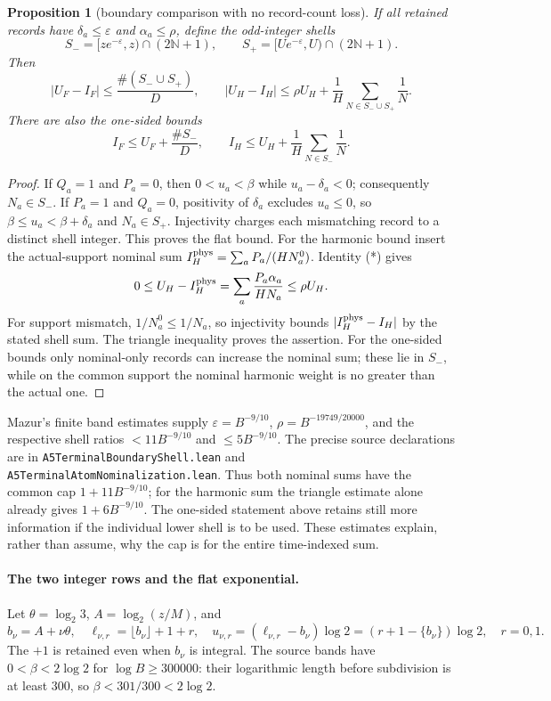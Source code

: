 \documentclass[11pt]{article}
\newtheorem{proposition}{Proposition}
\theoremstyle{remark}\newtheorem{remark}[proposition]{Remark}
\begin{document}
\begin{proposition}[boundary comparison with no record-count loss]
\label{prop:mazur-boundaries}
If all retained records have $\delta_a\le\varepsilon$ and
$\alpha_a\le\rho$, define the odd-integer shells
\[
 S_-=[ze^{-\varepsilon},z)\cap(2\mathbb N+1),\qquad
 S_+=[Ue^{-\varepsilon},U)\cap(2\mathbb N+1).
\]
Then
\[
 |U_F-I_F|\le\frac{\#(S_-\cup S_+)}D,\qquad
 |U_H-I_H|\le\rho U_H+
       \frac1H\sum_{N\in S_-\cup S_+}\frac1N.
 \label{eq:mazur-shell-bounds}
\]
There are also the one-sided bounds
\[
 I_F\le U_F+\frac{\#S_-}{D},\qquad
 I_H\le U_H+\frac1H\sum_{N\in S_-}\frac1N.
\]
\end{proposition}
\begin{proof}
If $Q_a=1$ and $P_a=0$, then $0<u_a<\beta$ while
$u_a-\delta_a<0$; consequently $N_a\in S_-$.
If $P_a=1$ and $Q_a=0$, positivity of $\delta_a$ excludes
$u_a\le0$, so $\beta\le u_a<\beta+\delta_a$ and
$N_a\in S_+$. Injectivity charges each mismatching record to
a distinct shell integer. This proves the flat bound.
For the harmonic bound insert the actual-support nominal sum
$I_H^{\rm phys}=\sum_a P_a/(HN_a^0)$. Identity (*) gives
\[
 0\le U_H-I_H^{\rm phys}
       =\sum_a\frac{P_a\alpha_a}{HN_a}\le\rho U_H.
\]
For support mismatch, $1/N_a^0\le1/N_a$, so injectivity
bounds $|I_H^{\rm phys}-I_H|$ by the stated shell sum.
The triangle inequality proves the assertion.
For the one-sided bounds only nominal-only records can increase
the nominal sum; these lie in $S_-$, while on the common support
the nominal harmonic weight is no greater than the actual one.
\end{proof}

Mazur's finite band estimates supply
$\varepsilon=B^{-9/10}$, $\rho=B^{-19749/20000}$, and the
respective shell ratios $<11B^{-9/10}$ and $\le5B^{-9/10}$.
The precise source declarations are in
\texttt{A5TerminalBoundaryShell.lean} and
\texttt{A5TerminalAtomNominalization.lean}.
Thus both nominal sums have the common cap $1+11B^{-9/10}$;
for the harmonic sum the triangle estimate alone already gives
$1+6B^{-9/10}$. The one-sided statement above retains still more
information if the individual lower shell is to be used.
These estimates explain, rather than assume, why the cap is for
the entire time-indexed sum.

\paragraph{The two integer rows and the flat exponential.}
Let $\theta=\log_2 3$, $A=\log_2(z/M)$, and
\[
 b_\nu=A+\nu\theta,\quad
 \ell_{\nu,r}=\lfloor b_\nu\rfloor+1+r,\quad
 u_{\nu,r}=(\ell_{\nu,r}-b_\nu)\log2
             =(r+1-\{b_\nu\})\log2,\quad r=0,1.
\]
The $+1$ is retained even when $b_\nu$ is integral.
The source bands have $0<\beta<2\log2$ for $\log B\ge300000$:
their logarithmic length before subdivision is at least $300$,
so $\beta<301/300<2\log2$.
\end{document}
